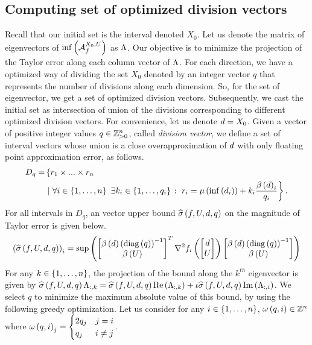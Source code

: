 \subsection{Computing set of optimized division vectors}
Recall that our initial set is the interval denoted $X_0$.  Let us
denote the matrix of eigenvectors of $\inf\left(\mathcal{A}_{f}^{X_0,U}\right)$ as
$\Lambda$.  Our objective is to minimize the projection of the Taylor
error along each column vector of $\Lambda$.  For each direction, we have
a optimized way of dividing the set $X_0$ denoted by an integer vector
$q$ that represents the number of divisions along each dimension.  So,
for the set of eigenvector, we get a set of optimized division
vectors.  Subsequently, we cast the initial set as intersection of
union of the divisions corresponding to different optimized division
vectors.  For convenience, let us denote $d=X_0$.  Given a
vector of positive integer values $q\in\mathbb{Z}_{>0}^n$,
called \emph{division vector}, we define a set of interval vectors
whose union is a close overapproximation of $d$ with only
floating point approximation error, as follows.
%
\begin{align*}
D_q
= & \left\{r_1\times...\times r_n\right.\\
& \left.\left|~\forall i\in\left\{1,\ldots,n\right\}~\exists k_i\in\left\{1,\ldots,q_i\right\}\right.:~r_i
= \mu\left(\inf\left(d_i\right)\right)+k_i\frac{\beta\left(d\right)_i}{q_i}\right\}.
\end{align*}
%
For all intervals in $D_q$, an vector upper bound
$\widehat{\sigma}\left(f,U,d,q\right)$ on the magnitude of Taylor error is given below.
%
\begin{align*}
\left(\widehat{\sigma}\left(f,U,d,q\right)\right)_i
= \sup\left(\begin{bmatrix}\beta\left(d\right)\left(\operatorname{diag}\left(q\right)\right)^{-1}\\ \beta\left(U\right)\end{bmatrix}^T{\nabla^2
f_i}\left(\begin{bmatrix}d\\ U\end{bmatrix}\right)\begin{bmatrix}\beta\left(d\right)\left(\operatorname{diag}\left(q\right)\right)^{-1}\\ \beta\left(U\right)\end{bmatrix}\right)
\end{align*}
%
For any $k\in\left\{1,\ldots,n\right\}$, the projection of the  bound
along the $k^{th}$ eigenvector is given by
$\widehat{\sigma}\left(f,U,d,q\right)\Lambda_{:,k}
= \widehat{\sigma}\left(f,U,d,q\right)\operatorname{Re}\left(\Lambda_{:,k}\right)
+ \iota\widehat{\sigma}\left(f,U,d,q\right)\operatorname{Im}\left(\Lambda_{:,i}\right)$.  We select $q$ to
minimize the maximum absolute value of this bound, by using the
following greedy optimization.  Let us consider for any
$i\in\left\{1,\ldots,n\right\}$, $\omega\left(q,i\right)\in\mathbb{Z}^n$ where $\omega\left(q,i\right)_j
= \begin{cases}2q_j & j=i\\ q_j & i\neq j \end{cases}$.

